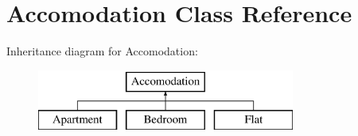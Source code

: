 \hypertarget{class_accomodation}{}\section{Accomodation Class Reference}
\label{class_accomodation}
Inheritance diagram for Accomodation\+:\begin{figure}[H]
\begin{center}
\leavevmode
\includegraphics[height=2.000000cm]{class_accomodation}
\end{center}
\end{figure}
